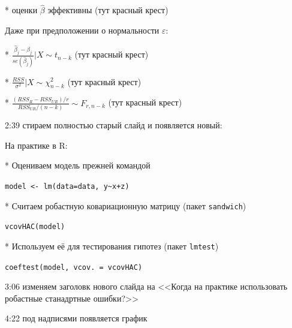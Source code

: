 \documentclass[12pt,a4paper]{article}
\newcommand{\e}{\varepsilon}
\begin{document}
* оценки $\hat{\beta}$ эффективны (тут красный крест)

Даже при предположении о нормальности $\e$:

* $\frac{\hat{\beta}_j-\beta_j}{se(\hat{\beta}_j)} | X \sim t_{n-k}$ (тут красный крест)

*  $\frac{RSS}{\sigma^2} |X \sim \chi^2_{n-k}$ (тут красный крест)

* $\frac{(RSS_R-RSS_{UR})/r}{RSS_{UR}/(n-k)} \sim F_{r,n-k}$ (тут красный крест)

2:39 стираем полностью старый слайд и появляется новый:

На практике в R: 

* Оцениваем модель прежней командой

\verb|model <- lm(data=data, y~x+z)|

* Считаем робастную ковариационную матрицу (пакет \verb|sandwich|)

\verb|vcovHAC(model)|

* Используем её для тестирования гипотез (пакет \verb|lmtest|)

\verb|coeftest(model, vcov. = vcovHAC)|

3:06 изменяем заголовк нового слайда на <<Когда на практике использовать робастные станадртные ошибки?>>

4:22 под надписями появляется график 
\end{document}
